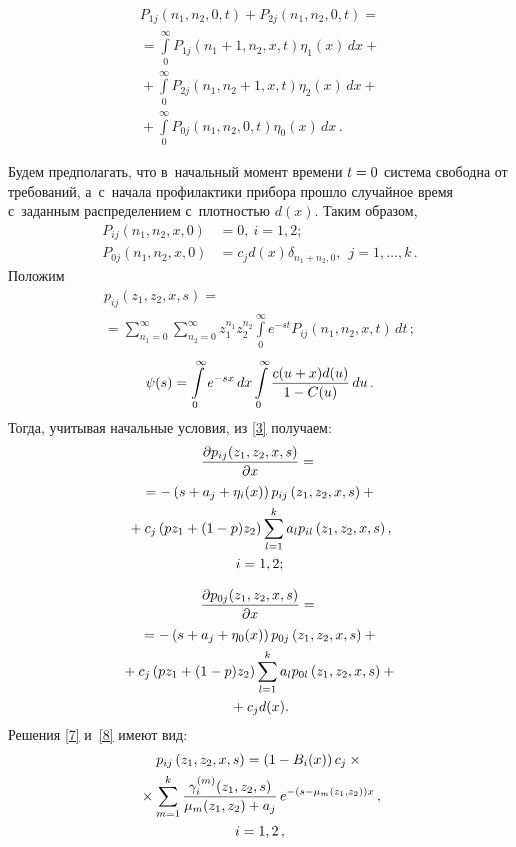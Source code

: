 \begin{multicols}{2}
\vspace*{-12pt}

\noindent
\begin{multline}
\label{6}
P_{1j}(n_1,n_2,0,t)+P_{2j}(n_1,n_2,0,t)={}\\
{}=\int\limits_0^{\infty}P_{1j}(n_1+1,n_2,x,t)\eta_1(x)\,dx+{}\\
{}+
\int\limits_0^{\infty}P_{2j}(n_1,n_2+1,x,t)\eta_2(x)\,dx+{}\\
{}+\int\limits_0^{\infty}P_{0j}(n_1,n_2,0,t)\eta_0(x)\,dx\,.
\end{multline}

Будем предполагать, что в~начальный момент времени $t\hm=0$ система
свободна от требований, а~с~начала профилактики прибора прошло
случайное время с~заданным распределением с~плотностью $d(x).$
Таким образом,
\begin{align*}
P_{ij}\left(n_1,n_2,x,0\right)&=0,\ i=1,2;
\\
P_{0j}\left(n_1,n_2,x,0\right)&=c_jd(x)\delta_{n_1+n_2,0},\ \
j=1,\ldots,k\,.
\end{align*}
Положим
\begin{multline*}
p_{ij}\left(z_1,z_2,x,s\right)={}\\
{}=\sum\limits_{n_1=0}^{\infty}
\sum\limits_{n_2=0}^{\infty}z_1^{n_1}z_2^{n_2}\!
\int\limits_0^{\infty}e^{-st}P_{ij}(n_1,n_2,x,t)\,dt\,;
\end{multline*}
$$
  \psi(s)=\int\limits_0^{\infty}e^{-sx}\,dx
  \int\limits_0^{\infty}\displaystyle\frac{\displaystyle c(u+x)d(u)\mathstrut}{\displaystyle 1-C(u)\mathstrut}\,du\,.
$$
Тогда, учитывая начальные условия,  из \eqref{3}
получаем:
\begin{multline}
\label{7} 
\displaystyle\frac{\displaystyle \partial p_{ij}(z_1,z_2,x,s)\mathstrut}{\displaystyle \partial x\mathstrut}={}\\
{}=-\left(s+a_j+\eta_i(x)\right)p_{ij}
\left(z_1,z_2,x,s\right)+{}\\
{}+c_j\left(pz_1+(1-p)z_2\right)
\sum\limits_{l=1}^ka_lp_{il}\left(z_1,z_2,x,s\right),\\ 
i=1,2;
\end{multline}

\vspace*{-12pt}

\noindent
\begin{multline}
\label{8} 
\displaystyle\frac{\displaystyle \partial p_{0j}(z_1,z_2,x,s)\mathstrut}{\displaystyle \partial x\mathstrut}={}\\
{}=-\left(s+a_j+\eta_0(x)\right)p_{0j}\left(z_1,z_2,x,s\right)+{}\\
{}+c_j\left(pz_1+(1-p)z_2\right)\sum\limits_{l=1}^ka_lp_{0l}\left(z_1,z_2,x,s\right)+{}\\
{}+ c_jd(x).
\end{multline}
Решения \eqref{7} и~\eqref{8} имеют вид:
\begin{multline}
\label{9}
p_{ij}\left(z_1,z_2,x,s\right)=\left(1-B_i(x)\right)c_j\times{}\\
{}\times \sum\limits_{m=1}^k\displaystyle\frac{\displaystyle \gamma_i^{(m)}(z_1,z_2,s)\mathstrut}{\displaystyle \mu_m(z_1,z_2)+a_j\mathstrut}\,
e^{-(s-\mu_m(z_1,z_2))x}\,,\\
 i=1,2\,,
\end{multline}
\vspace*{-12pt}


\end{multicols}
